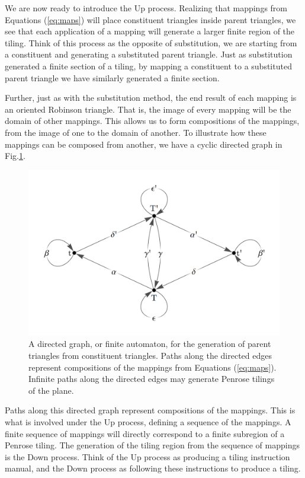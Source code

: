 \documentclass[
  oneside,
  11pt, a4paper,
  footinclude=true,
  headinclude=true,
  cleardoublepage=empty
]{scrbook}
\begin{document}
We are now ready to introduce the Up process. Realizing that mappings from Equations (\ref{eq:maps}) will place constituent triangles inside parent triangles, we see that each application of a mapping will generate a larger finite region of the tiling. Think of this process as the opposite of substitution, we are starting from a constituent and generating a substituted parent triangle. Just as substitution generated a finite section of a tiling, by mapping a constituent to a substituted parent triangle we have similarly generated a finite section.

Further, just as with the substitution method, the end result of each mapping is an oriented Robinson triangle. That is, the image of every mapping will be the domain of other mappings. This allows us to form compositions of the mappings, from the image of one to the domain of another. To illustrate how these mappings can be composed from another, we have a cyclic directed graph in Fig.\ref{fig:UpDownGraph}.

\begin{figure}[H]
\centering
\includegraphics[width=\textwidth]{UpDownGraph}
\caption{A directed graph, or finite automaton, for the generation of parent triangles from constituent triangles. Paths along the directed edges represent compositions of the mappings from Equations (\ref{eq:maps}). Infinite paths along the directed edges may generate Penrose tilings of the plane.}
\label{fig:UpDownGraph}
\end{figure}

Paths along this directed graph represent compositions of the mappings. This is what is involved under the Up process, defining a sequence of the mappings. A finite sequence of mappings will directly correspond to a finite subregion of a Penrose tiling. The generation of the tiling region from the sequence of mappings is the Down process. Think of the Up process as producing a tiling instruction manual, and the Down process as following these instructions to produce a tiling. 
\end{document}
